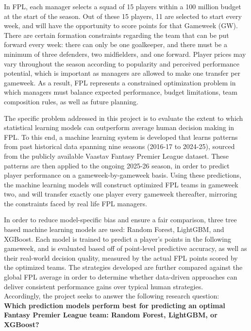 \documentclass[11pt,a4paper]{article}
\begin{document}
In FPL, each manager selects a squad of 15 players within a 100 million budget at the start of the season. Out of these 15 players, 11 are selected to start every week, and will have the opportunity to score points for that Gameweek (GW). There are certain formation constraints regarding the team that can be put forward every week: there can only be one goalkeeper, and there must be a minimum of three defenders, two midfielders, and one forward. Player prices may vary throughout the season according to popularity and perceived performance potential, which is important as managers are allowed to make one transfer per gameweek. As a result, FPL represents a constrained optimization problem in which managers must balance expected performance, budget limitations, team composition rules, as well as future planning. 

The specific problem addressed in this project is to evaluate the extent to which statistical learning models can outperform average human decision making in FPL. To this end, a machine learning system is developed that learns patterns from past historical data spanning nine seasons (2016-17 to 2024-25), sourced from the publicly available Vaastav Fantasy Premier League dataset. These patterns are then applied to the ongoing 2025-26 season, in order to predict player performance on a gameweek-by-gameweek basis. Using these predictions, the machine learning models will construct optimized FPL teams in gameweek two, and will transfer exactly one player every gameweek thereafter, mirroring the constraints faced by real life FPL managers. 

In order to reduce model-specific bias and ensure a fair comparison, three tree based machine learning models are used: Random Forest, LightGBM, and XGBoost. Each model is trained to predict a player’s points in the following gameweek, and is evaluated based off of point-level predictive accuracy, as well as their real-world decision quality, measured by the actual FPL points scored by the optimized teams. The strategies developed are further compared against the global FPL average in order to determine whether data-driven approaches can deliver consistent performance gains over typical human strategies.\\

Accordingly, the project seeks to answer the following research question:\\

\textbf{Which prediction models perform best for predicting an optimal Fantasy Premier League team: Random Forest, LightGBM, or XGBoost?}\\
\end{document}
